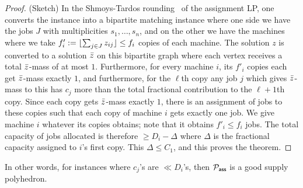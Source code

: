 	\begin{proof} (Sketch) In the Shmoys-Tardos rounding~\cite{shmoys-tardos} of the assignment LP, one converts the instance into a bipartite matching instance where one side we have the jobs $J$ with 
		multiplicities $s_1,\ldots,s_n$, and on the other we have the machines where we take $f'_i := \lfloor\sum_{j\in J} z_{ij}\rfloor \le f_i$ copies of each machine. 
		The solution $z$ is converted to a solution $\bar{z}$ on this bipartite graph where each vertex receives a total $\bar{z}$-mass of at most $1$. Furthermore, for every machine $i$, its $f'_i$ copies
		each get $\bar{z}$-mass exactly $1$, and furthermore, for the $\ell$th copy any job $j$ which gives $\bar{z}$-mass to this has $c_j$ more than the total fractional contribution to the $\ell+1$th copy.
		Since each copy gets $\bar{z}$-mass exactly $1$, there is an assignment of jobs to these copies such that each copy of machine $i$ gets exactly one job. We give machine $i$ whatever its copies obtains; note that it obtains $f'_i \leq f_i$ jobs.
		The total capacity of jobs allocated is therefore $\ge D_i - \Delta$ where $\Delta$ is the fractional capacity assigned to $i$'s first copy. This $\Delta\leq C_1$, and this proves the theorem.
%		
%	
%		
	\end{proof}
	

\noindent
In other words, for instances where $c_j$'s are $\ll D_i$'s, then ${\cal P}_\mathsf{ass}$ is a good supply polyhedron. \smallskip

